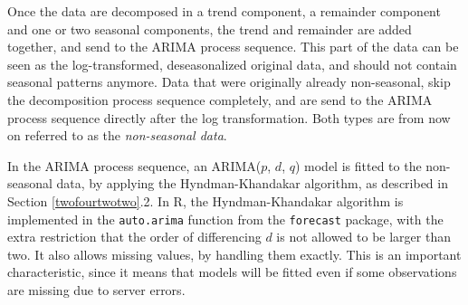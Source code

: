 \documentclass[12pt,oneside]{reedthesis}
\begin{document}
Once the data are decomposed in a trend component, a remainder component
and one or two seasonal components, the trend and remainder are added
together, and send to the ARIMA process sequence. This part of the data
can be seen as the log-transformed, deseasonalized original data, and
should not contain seasonal patterns anymore. Data that were originally
already non-seasonal, skip the decomposition process sequence
completely, and are send to the ARIMA process sequence directly after
the log transformation. Both types are from now on referred to as the
\emph{non-seasonal data}.

In the ARIMA process sequence, an ARIMA(\(p\), \(d\), \(q\)) model is
fitted to the non-seasonal data, by applying the Hyndman-Khandakar
algorithm, as described in Section \ref{twofourtwotwo}.2. In R, the
Hyndman-Khandakar algorithm is implemented in the \texttt{auto.arima}
function from the \texttt{forecast} package, with the extra restriction
that the order of differencing \(d\) is not allowed to be larger than
two. It also allows missing values, by handling them exactly. This is an
important characteristic, since it means that models will be fitted even
if some observations are missing due to server errors.
\end{document}
